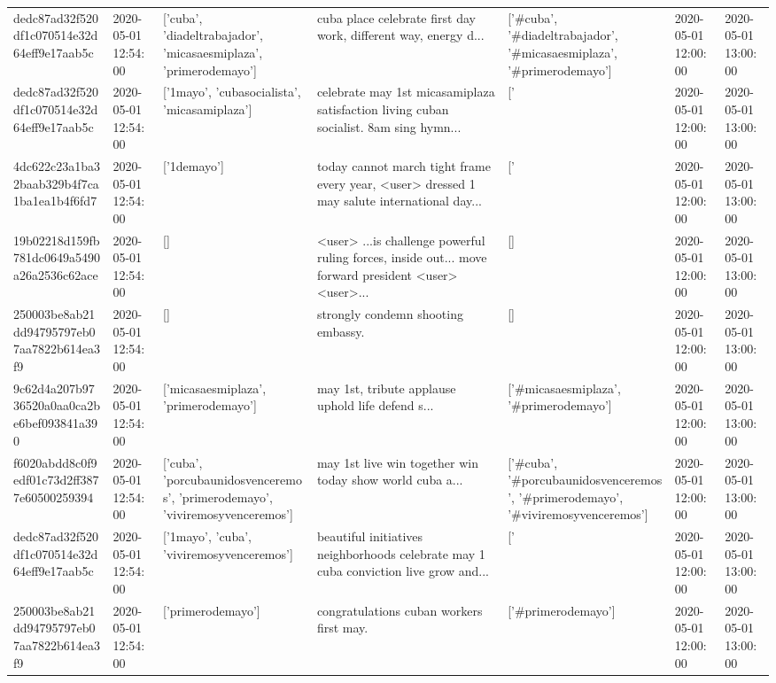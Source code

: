 \begin{tabular}{lllllll}
dedc87ad32f520df1c070514e32d64eff9e17aab5c & 2020-05-01 12:54:00 & ['cuba', 'diadeltrabajador', 'micasaesmiplaza', 'primerodemayo'] & cuba place celebrate first day work, different way, energy d... & ['#cuba', '#diadeltrabajador', '#micasaesmiplaza', '#primerodemayo'] & 2020-05-01 12:00:00 & 2020-05-01 13:00:00 \\
dedc87ad32f520df1c070514e32d64eff9e17aab5c & 2020-05-01 12:54:00 & ['1mayo', 'cubasocialista', 'micasamiplaza'] & celebrate may 1st micasamiplaza satisfaction living cuban socialist. 8am sing hymn... & ['#1mayo', '#cubasocialista', '#micasamiplaza'] & 2020-05-01 12:00:00 & 2020-05-01 13:00:00 \\
4dc622c23a1ba32baab329b4f7ca1ba1ea1b4f6fd7 & 2020-05-01 12:54:00 & ['1demayo'] & today cannot march tight frame every year, <user> dressed 1 may salute international day... & ['#1demayo'] & 2020-05-01 12:00:00 & 2020-05-01 13:00:00 \\
19b02218d159fb781dc0649a5490a26a2536c62ace & 2020-05-01 12:54:00 & [] & <user> ...is challenge powerful ruling forces, inside out... move forward president <user> <user>... & [] & 2020-05-01 12:00:00 & 2020-05-01 13:00:00 \\
250003be8ab21dd94795797eb07aa7822b614ea3f9 & 2020-05-01 12:54:00 & [] & strongly condemn shooting embassy. & [] & 2020-05-01 12:00:00 & 2020-05-01 13:00:00 \\
9c62d4a207b9736520a0aa0ca2be6bef093841a390 & 2020-05-01 12:54:00 & ['micasaesmiplaza', 'primerodemayo'] & may 1st, tribute applause uphold life defend s... & ['#micasaesmiplaza', '#primerodemayo'] & 2020-05-01 12:00:00 & 2020-05-01 13:00:00 \\
f6020abdd8c0f9edf01c73d2ff3877e60500259394 & 2020-05-01 12:54:00 & ['cuba', 'porcubaunidosvenceremos', 'primerodemayo', 'viviremosyvenceremos'] & may 1st live win together win today show world cuba a... & ['#cuba', '#porcubaunidosvenceremos', '#primerodemayo', '#viviremosyvenceremos'] & 2020-05-01 12:00:00 & 2020-05-01 13:00:00 \\
dedc87ad32f520df1c070514e32d64eff9e17aab5c & 2020-05-01 12:54:00 & ['1mayo', 'cuba', 'viviremosyvenceremos'] & beautiful initiatives neighborhoods celebrate may 1 cuba conviction live grow and... & ['#1mayo', '#cuba', '#viviremosyvenceremos'] & 2020-05-01 12:00:00 & 2020-05-01 13:00:00 \\
250003be8ab21dd94795797eb07aa7822b614ea3f9 & 2020-05-01 12:54:00 & ['primerodemayo'] & congratulations cuban workers first may. & ['#primerodemayo'] & 2020-05-01 12:00:00 & 2020-05-01 13:00:00 \\

\end{tabular}
